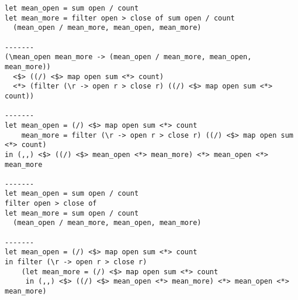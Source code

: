 \begin{lstlisting}
let mean_open = sum open / count
let mean_more = filter open > close of sum open / count
  (mean_open / mean_more, mean_open, mean_more)

-------
(\mean_open mean_more -> (mean_open / mean_more, mean_open, mean_more))
  <$> ((/) <$> map open sum <*> count)
  <*> (filter (\r -> open r > close r) ((/) <$> map open sum <*> count))

-------
let mean_open = (/) <$> map open sum <*> count
    mean_more = filter (\r -> open r > close r) ((/) <$> map open sum <*> count)
in (,,) <$> ((/) <$> mean_open <*> mean_more) <*> mean_open <*> mean_more

-------
let mean_open = sum open / count
filter open > close of
let mean_more = sum open / count
  (mean_open / mean_more, mean_open, mean_more)

-------
let mean_open = (/) <$> map open sum <*> count
in filter (\r -> open r > close r)
    (let mean_more = (/) <$> map open sum <*> count
     in (,,) <$> ((/) <$> mean_open <*> mean_more) <*> mean_open <*> mean_more)
\end{lstlisting}

